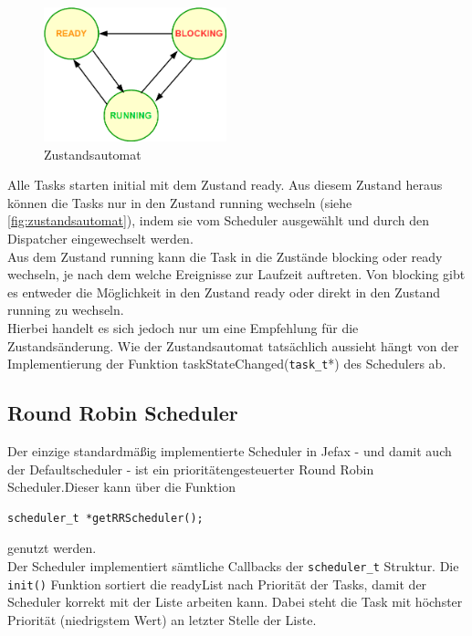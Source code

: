 \documentclass[fontsize=12pt, toc=bibliography, notitlepage]{scrreprt}
\begin{document}
\begin{figure}[H]
	\centering
	\includegraphics[width=200px]{images/Zustandsautomat.png}
	\caption{Zustandsautomat}
	\label{fig:zustandsautomat}
\end{figure}

Alle Tasks starten initial mit dem Zustand ready. Aus diesem Zustand heraus können die Tasks nur in den Zustand running wechseln (siehe \autoref{fig:zustandsautomat}), indem sie vom Scheduler ausgewählt und durch den Dispatcher eingewechselt werden.\\

Aus dem Zustand running kann die Task in die Zustände blocking oder ready wechseln, je nach dem welche Ereignisse zur Laufzeit auftreten. Von blocking gibt es entweder die Möglichkeit in den Zustand ready oder direkt in den Zustand running zu wechseln.\\

Hierbei handelt es sich jedoch nur um eine Empfehlung für die Zustandsänderung. Wie der Zustandsautomat tatsächlich aussieht hängt von der Implementierung der Funktion taskStateChanged(\verb|task_t|*) des Schedulers ab.

\subsection{Round Robin Scheduler}
\label{subsec:round-robin-scheduler}
Der einzige standardmäßig implementierte Scheduler in Jefax - und damit auch der Defaultscheduler - ist ein prioritätengesteuerter Round Robin Scheduler.Dieser kann über die Funktion

\begin{lstlisting}
scheduler_t *getRRScheduler();
\end{lstlisting}

genutzt werden.\\

Der Scheduler implementiert sämtliche Callbacks der \verb|scheduler_t| Struktur.
Die \lstinline$init()$ Funktion sortiert die readyList nach Priorität der Tasks, damit der Scheduler korrekt mit der Liste arbeiten kann. Dabei steht die Task mit höchster Priorität (niedrigstem Wert) an letzter Stelle der Liste.\\
\end{document}
